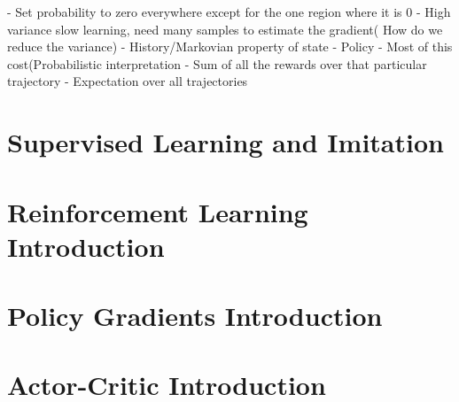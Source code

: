 \documentclass{article}
\begin{document}
- Set probability to zero everywhere except for the one region where it is 0
- High variance slow learning, need many samples to estimate the gradient( How do we reduce the variance)
- History/Markovian property of state
- Policy
- Most of this cost(Probabilistic interpretation
- Sum of all the rewards over that particular trajectory
- Expectation over all trajectories

\section{Supervised Learning and Imitation}


\section{Reinforcement Learning Introduction}

\section{Policy Gradients Introduction}

\section{Actor-Critic Introduction}

\small


\end{document}
